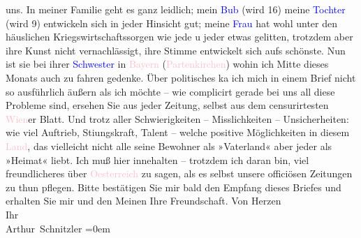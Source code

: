                     uns. In meiner Familie geht es ganz leidlich; mein \textcolor{blue}{Bub}{} (wird 16) meine \textcolor{blue}{Tochter}{} (wird 9) entwickeln sich in jeder
                    Hinsicht gut; meine \textcolor{blue}{Frau}{}
                    hat wohl unter den häuslichen Kriegswirtschaftssorgen wie jede u jeder etwas
                    gelitten, trotzdem aber ihre Kunst nicht vernachlässigt, ihre Stimme entwickelt
                    sich aufs schönste. Nun ist sie bei ihrer \textcolor{blue}{Schwester}{} in \textcolor{pink}{Bayern}{}\ledrightnote{\textcolor{pink}{Bayern}}
                        (\textcolor{pink}{Partenkirchen}{}\ledrightnote{\textcolor{pink}{Garmisch-Partenkirchen}}) wohin ich Mitte dieses
                    Monats auch zu fahren gedenke. Über politisches ka{\geminationn}
                    ich mich in einem Brief nicht so ausführlich äußern als ich möchte – wie
                    complicirt gerade bei uns all diese Probleme sind, ersehen Sie aus jeder
                    Zeitung, selbst aus dem censurirtesten \textcolor{pink}{Wien}{}\ledrightnote{\textcolor{pink}{Wien}}er
                    Blatt. Und trotz aller Schwierigkeiten – Misslichkeiten – Unsicherheiten: wie
                    viel Auftrieb, Sti{\geminationm}ungskraft, Talent – welche
                    positive Möglichkeiten in diesem \textcolor{pink}{Land}{}, das vielleicht nicht {\pb}alle
                    seine Bewohner als »Vaterland« aber jeder als »Heimat« liebt. Ich muß hier
                    innehalten – trotzdem ich daran bin, viel freundlicheres über \textcolor{pink}{Oesterreich}{}\ledrightnote{\textcolor{pink}{Österreich}} zu sagen, als es \introOben{}selbst\introOben{} unsere officiösen Zeitungen zu thun pflegen.\pend
           \pstart
           Bitte bestätigen Sie mir bald den Empfang dieses Briefes und erhalten Sie mir und
                    den Meinen Ihre Freundschaft.\pend
           \pstart
           Von Herzen{\\[\baselineskip]}Ihr{\\[\baselineskip]}\spacefill\mbox{Arthur Schnitzler}\pend
           \leftskip=0em{}\endnumbering{}  
      